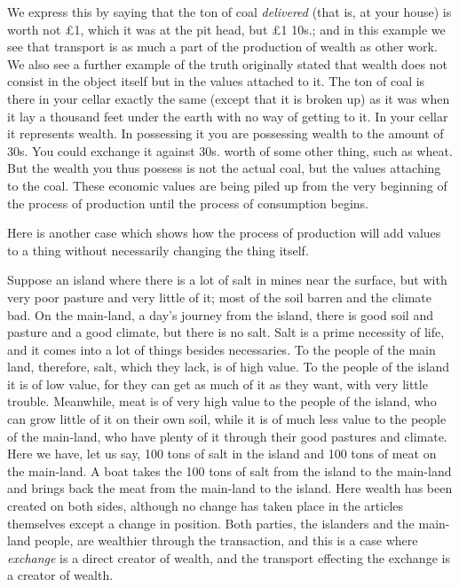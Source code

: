 \documentclass{book}
\begin{document}
We express this by saying that the ton of coal \emph{delivered} (that is, at your house) is worth not £1, which it was at the pit head, but £1 10s.; and in this example we see that transport is as much a part of the production of wealth as other work. We also see a further example of the truth originally stated that wealth does not consist in the object itself but in the values attached to it. The ton of coal is there in your cellar exactly the same (except that it is broken up) as it was when it lay a thousand feet under the earth with no way of getting to it. In your cellar it represents wealth. In possessing it you are possessing wealth to the amount of 30s. You could exchange it against 30s. worth of some other thing, such as wheat. But the wealth you thus possess is not the actual coal, but the values attaching to the coal. These economic values are being piled up from the very beginning of the process of production until the process of consumption begins.

Here is another case which shows how the process of production will add values to a thing without necessarily changing the thing itself.

Suppose an island where there is a lot of salt in mines near the surface, but with very poor pasture and very little of it; most of the soil barren and the climate bad. On the main-land, a day’s journey from the island, there is good soil and pasture and a good climate, but there is no salt. Salt is a prime necessity of life, and it comes into a lot of things besides necessaries. To the people of the main land, therefore, salt, which they lack, is of high value. To the people of the island it is of low value, for they can get as much of it as they want, with very little trouble. Meanwhile, meat is of very high value to the people of the island, who can grow little of it on their own soil, while it is of much less value to the people of the main-land, who have plenty of it through their good pastures and climate. Here we have, let us say, 100 tons of salt in the island and 100 tons of meat on the main-land. A boat takes the 100 tons of salt from the island to the main-land and brings back the meat from the main-land to the island. Here wealth has been created on both sides, although no change has taken place in the articles themselves except a change in position. Both parties, the islanders and the main-land people, are wealthier through the transaction, and this is a case where \emph{exchange} is a direct creator of wealth, and the transport effecting the exchange is a creator of wealth.
\end{document}

